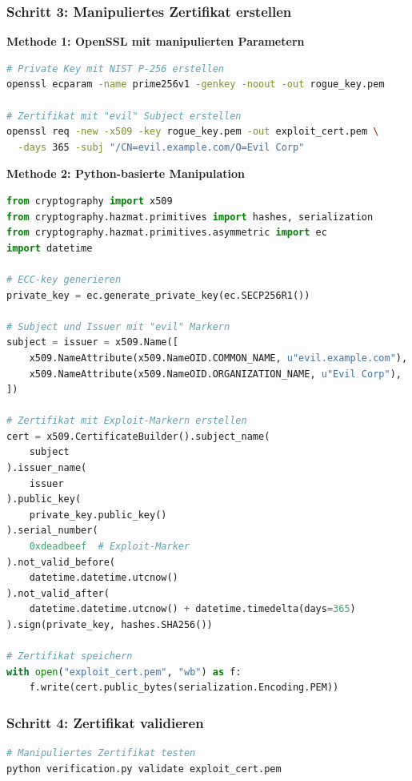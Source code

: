 \documentclass{article}
\begin{document}
\subsubsection{Schritt 3: Manipuliertes Zertifikat erstellen}

\textbf{Methode 1: OpenSSL mit manipulierten Parametern}

\begin{lstlisting}[language=bash, caption=Rogue Key Generation]
# Private Key mit NIST P-256 erstellen
openssl ecparam -name prime256v1 -genkey -noout -out rogue_key.pem

# Zertifikat mit "evil" Subject erstellen
openssl req -new -x509 -key rogue_key.pem -out exploit_cert.pem \
  -days 365 -subj "/CN=evil.example.com/O=Evil Corp"
\end{lstlisting}

\textbf{Methode 2: Python-basierte Manipulation}

\begin{lstlisting}[language=python, caption=Zertifikat mit Exploit-Markern]
from cryptography import x509
from cryptography.hazmat.primitives import hashes, serialization
from cryptography.hazmat.primitives.asymmetric import ec
import datetime

# ECC-key generieren
private_key = ec.generate_private_key(ec.SECP256R1())

# Subject und Issuer mit "evil" Markern
subject = issuer = x509.Name([
    x509.NameAttribute(x509.NameOID.COMMON_NAME, u"evil.example.com"),
    x509.NameAttribute(x509.NameOID.ORGANIZATION_NAME, u"Evil Corp"),
])

# Zertifikat mit Exploit-Markern erstellen
cert = x509.CertificateBuilder().subject_name(
    subject
).issuer_name(
    issuer
).public_key(
    private_key.public_key()
).serial_number(
    0xdeadbeef  # Exploit-Marker
).not_valid_before(
    datetime.datetime.utcnow()
).not_valid_after(
    datetime.datetime.utcnow() + datetime.timedelta(days=365)
).sign(private_key, hashes.SHA256())

# Zertifikat speichern
with open("exploit_cert.pem", "wb") as f:
    f.write(cert.public_bytes(serialization.Encoding.PEM))
\end{lstlisting}

\subsubsection{Schritt 4: Zertifikat validieren}

\begin{lstlisting}[language=bash, caption=Exploit-Validierung]
# Manipuliertes Zertifikat testen
python verification.py validate exploit_cert.pem
\end{lstlisting}
\end{document}
